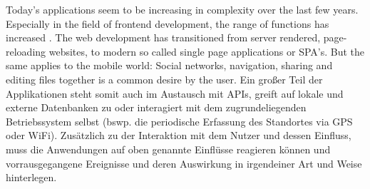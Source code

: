 

Today's applications seem to be increasing in complexity over the last few years. 
Especially in the field of frontend development, the range of functions has increased \cite{kevin2018}.
The web development has transitioned from server rendered, page-reloading websites, to modern so called single page applications or SPA's.
But the same applies to the mobile world: Social networks, navigation, sharing and editing files together is a common desire by the user.
Ein großer Teil der Applikationen steht somit auch im Austausch mit APIs, greift auf lokale und externe Datenbanken zu oder interagiert 
mit dem zugrundeliegenden Betriebssystem selbst (bswp. die periodische Erfassung des Standortes via GPS oder WiFi).
Zusätzlich zu der Interaktion mit dem Nutzer und dessen Einfluss, muss die Anwendungen auf oben genannte Einflüsse reagieren können 
und vorrausgegangene Ereignisse und deren Auswirkung in irgendeiner Art und Weise hinterlegen.


